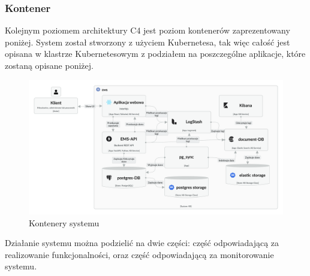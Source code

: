\subsubsection{Kontener}
Kolejnym poziomem architektury C4 jest poziom kontenerów zaprezentowany poniżej. System został stworzony z użyciem Kubernetesa, tak więc całość jest opisana w klastrze Kubernetesowym z podziałem na poszczególne aplikacje, które zostaną opisane poniżej.
\begin{figure}[H]
    \centering
    \includegraphics[width=1\linewidth]{img/Container_Diagram.png}
    \caption{Kontenery systemu}
    \label{fig:full-arch}
\end{figure}
Działanie systemu można podzielić na dwie części: część odpowiadającą za realizowanie funkcjonalności, oraz część odpowiadającą za monitorowanie systemu.

